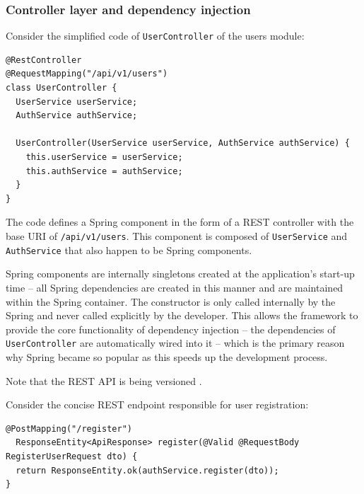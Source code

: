 \documentclass[a4paper,twoside,12pt]{book}
\begin{document}
\subsubsection{Controller layer and dependency injection}

Consider the simplified code of \texttt{UserController} of the users module:

\begin{verbatim}
@RestController
@RequestMapping("/api/v1/users")
class UserController {
  UserService userService;
  AuthService authService;

  UserController(UserService userService, AuthService authService) {
    this.userService = userService;
    this.authService = authService;
  }
}
\end{verbatim}

The code defines a Spring component in the form of a REST controller with the base URI of \verb|/api/v1/users|. This component is composed of \texttt{UserService} and \texttt{AuthService} that also happen to be Spring components.

Spring components are internally singletons \cite{bib:gamma} created at the application's start-up time -- all Spring dependencies are created in this manner and are maintained within the Spring container. The constructor is only called internally by the Spring and never called explicitly by the developer. This allows the framework to provide the core functionality of dependency injection \cite{bib:spring_in_action} -- the dependencies of \texttt{UserController} are automatically wired into it -- which is the primary reason why Spring became so popular as this speeds up the development process.

Note that the REST API is being versioned \cite{bib:modern_fullstack}.

Consider the concise REST endpoint responsible for user registration:
\begin{verbatim}
@PostMapping("/register")
  ResponseEntity<ApiResponse> register(@Valid @RequestBody RegisterUserRequest dto) {
  return ResponseEntity.ok(authService.register(dto));
}
\end{verbatim}
\end{document}
